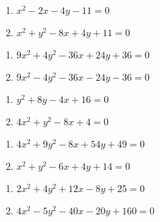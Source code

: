 \documentclass{ximera}
\begin{document}
\begin{multicols}{2}
\begin{enumerate}
\setcounter{enumi}{\value{HW}}

\item $x^2-2x-4y-11=0$  \label{generalconicfirst}
\item $x^2 + y^2-8x+4y+11=0$

\setcounter{HW}{\value{enumi}}
\end{enumerate}
\end{multicols}

\begin{multicols}{2}
\begin{enumerate}
\setcounter{enumi}{\value{HW}}

\item  $9x^2 + 4y^2-36x+24y + 36=0$

\item $9x^2-4y^2-36x-24y-36=0$


\setcounter{HW}{\value{enumi}}
\end{enumerate}
\end{multicols}


\begin{multicols}{2}
\begin{enumerate}
\setcounter{enumi}{\value{HW}}

\item  $y^2+8y-4x+16=0$

\item  $4x^2+y^2-8x+4=0$


\setcounter{HW}{\value{enumi}}
\end{enumerate}
\end{multicols}


\begin{multicols}{2}
\begin{enumerate}
\setcounter{enumi}{\value{HW}}

\item   $4x^2+9y^2-8x+54y+49=0$

\item  $x^2 + y^2-6x+4y+14=0$

\setcounter{HW}{\value{enumi}}
\end{enumerate}
\end{multicols}


\begin{multicols}{2}
\begin{enumerate}
\setcounter{enumi}{\value{HW}}

\item  $2x^2+ 4y^2+12x-8y+25=0$

\item   $4x^2-5y^2-40x-20y+160=0$  \label{generalconiclast}


\setcounter{HW}{\value{enumi}}
\end{enumerate}
\end{multicols}
\end{document}
